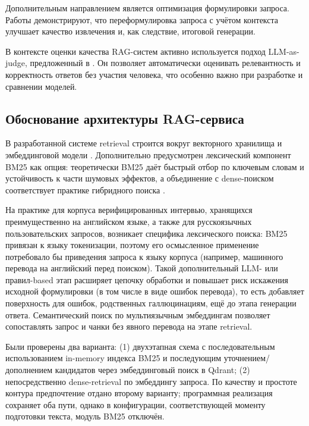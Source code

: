 \documentclass{article}
\begin{document}
Дополнительным направлением является оптимизация формулировки запроса. Работы \cite{ma2023query, deng2023prompt} демонстрируют, что переформулировка запроса с учётом контекста улучшает качество извлечения и, как следствие, итоговой генерации.

В контексте оценки качества RAG-систем активно используется подход LLM-as-judge, предложенный в \cite{zheng2023judging, liu2023geval}. Он позволяет автоматически оценивать релевантность и корректность ответов без участия человека, что особенно важно при разработке и сравнении моделей.

\subsection{Обоснование архитектуры RAG-сервиса}
\label{subsec:rag-arch-justify}

В разработанной системе retrieval строится вокруг векторного хранилища и эмбеддинговой модели \cite{karpukhin2020dense, thakur2021beir}. Дополнительно предусмотрен лексический компонент BM25 \cite{robertson2009probabilistic} как опция: теоретически BM25 даёт быстрый отбор по ключевым словам и устойчивость к части шумовых эффектов, а объединение с dense-поиском соответствует практике гибридного поиска \cite{lin2021notes, thakur2021beir}.

На практике для корпуса верифицированных интервью, хранящихся преимущественно на английском языке, а также для русскоязычных пользовательских запросов, возникает специфика лексического поиска: BM25 привязан к языку токенизации, поэтому его осмысленное применение потребовало бы приведения запроса к языку корпуса (например, машинного перевода на английский перед поиском). Такой дополнительный LLM- или правил-based этап расширяет цепочку обработки и повышает риск искажения исходной формулировки (в том числе в виде ошибок перевода), то есть добавляет поверхность для ошибок, родственных галлюцинациям, ещё до этапа генерации ответа. Семантический поиск по мультиязычным эмбеддингам позволяет сопоставлять запрос и чанки без явного перевода на этапе retrieval.

Были проверены два варианта: (1) двухэтапная схема с последовательным использованием in-memory индекса BM25 и последующим уточнением/дополнением кандидатов через эмбеддинговый поиск в Qdrant; (2) непосредственно dense-retrieval по эмбеддингу запроса. По качеству и простоте контура предпочтение отдано второму варианту; программная реализация сохраняет оба пути, однако в конфигурации, соответствующей моменту подготовки текста, модуль BM25 отключён.
\end{document}
